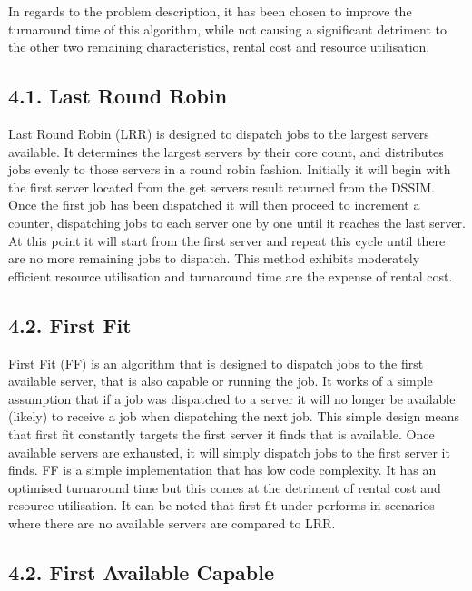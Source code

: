 \documentclass[a4paper]{article} %
\begin{document}
In regards to the problem description, it has been chosen to improve the turnaround time of this algorithm, while not causing a significant detriment to the other two remaining characteristics, rental cost and resource utilisation.

\subsection*{4.1. Last Round Robin}

Last Round Robin (LRR) is designed to dispatch jobs to the largest servers available. It determines the largest servers by their core count, and distributes jobs evenly to those servers in a round robin fashion. Initially it will begin with the first server located from the get servers result returned from the DSSIM. Once the first job has been dispatched it will then proceed to increment a counter, dispatching jobs to each server one by one until it reaches the last server. At this point it will start from the first server and repeat this cycle until there are no more remaining jobs to dispatch. This method exhibits moderately efficient resource utilisation and turnaround time are the expense of rental cost.

\subsection*{4.2. First Fit}

First Fit (FF) is an algorithm that is designed to dispatch jobs to the first available server, that is also capable or running the job. It works of a simple assumption that if a job was dispatched to a server it will no longer be available (likely) to receive a job when dispatching the next job. This simple design means that first fit constantly targets the first server it finds that is available. Once available servers are exhausted, it will simply dispatch jobs to the first server it finds. FF is a simple implementation that has low code complexity. It has an optimised turnaround time but this comes at the detriment of rental cost and resource utilisation. It can be noted that first fit under performs in scenarios where there are no available servers are compared to LRR.

\subsection*{4.2. First Available Capable}
\end{document}
